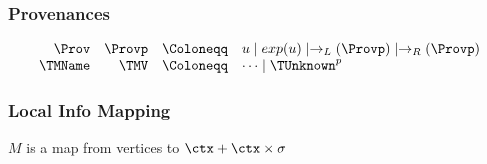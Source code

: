 \subsubsection{Provenances}

\[\begin{array}{rrcl}
    \Prov & \Provp & \Coloneqq & u \mid exp(u) \mid \rightarrow_L(\Provp) \mid \rightarrow_R(\Provp)\\
    \TMName  & \TMV  & \Coloneqq & \dots \mid \TUnknown^{p}\\
\end{array}\]

\subsubsection{Local Info Mapping}

 $M$ is a map from vertices to $\ctx + \ctx \times \sigma$







